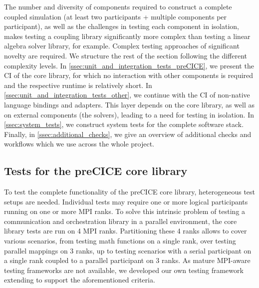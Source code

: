 The number and diversity of components required to construct a complete coupled simulation
(at least two participants + multiple components per participant), as well as the challenges in
testing each component in isolation, makes testing a coupling library significantly more complex than testing a linear algebra solver library, for example.
Complex testing approaches of significant novelty are required.
We structure the rest of the section following the different complexity levels.
In \autoref{ssec:unit_and_integration_tests_preCICE}, we present the CI of the core library, for which
no interaction with other components is required and the respective runtime is relatively short.
In \autoref{ssec:unit_and_integration_tests_other}, we continue with the CI of non-native language bindings and adapters. This layer depends on
the core library, as well as on external components (the solvers), leading to a need for testing in isolation.
In \autoref{ssec:system_tests}, we construct system tests for the complete software stack.
Finally, in \autoref{ssec:additional_checks}, we give an overview of additional checks and workflows which we use across the whole project.

\subsection{Tests for the preCICE core library}
\label{ssec:unit_and_integration_tests_preCICE}

To test the complete functionality of the preCICE core library, heterogeneous test setups are needed.
Individual tests may require one or more logical participants running on one or more MPI ranks. 
To solve this intrinsic problem of testing a communication and orchestration library in a parallel environment, the core library tests are run on 4 MPI ranks.
Partitioning these 4 ranks allows to cover various scenarios, from testing math functions on a single rank, over testing parallel mappings on 3 ranks, up to testing scenarios with a serial participant on a single rank coupled to a parallel participant on 3 ranks.
As mature MPI-aware testing frameworks are not available, we developed our own testing framework extending  to support the aforementioned criteria.

